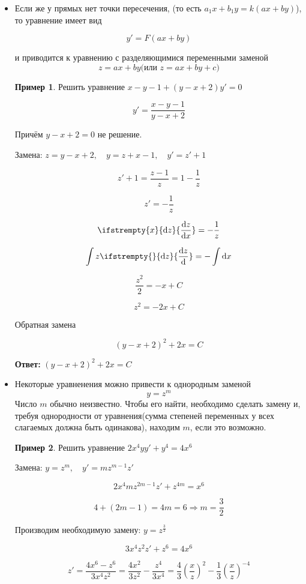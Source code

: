 \documentclass[a4paper, 14pt]{article}
\newcommand{\dx}{\mathrm{d}x}
\newcommand{\dv}[2]{%
  \ifstrempty{#2}%
    {\mathrm{d}#1}%
    {\frac{\mathrm{d}#1}{\mathrm{d}#2}}%
}
\theoremstyle{definition}
\newtheorem*{example}{Пример}
\newenvironment{answer}
  {\par\noindent\textbf{Ответ:}}
  {\par}
\begin{document}
\begin{itemize}
\item \textbf{}Если же у прямых нет точки пересечения, (то есть $a_1x+b_1y = k(ax+by)$), то уравнение имеет вид 
 
 \[y'= F(ax+by)\]
 
 и приводится к уравнению с разделяющимися переменными заменой 
 \[z = ax+by \text{(или } z = ax+by+c\text{)}\]

\begin{example}
    Решить уравнение $x-y-1 +(y-x+2)y'=0$

    \[y'=\frac{x-y-1}{y-x+2}\]

    Причём $y-x+2=0$ не решение.

    Замена: $z =y -x +2, \quad y = z +x-1, \quad y'= z'+1$

    \[z'+1=\frac{z-1}{z} = 1-\frac{1}{z}\]

    \[z'=-\frac{1}{z}\]

    \[\dv{z}{x}= -\frac{1}{z}\]

    \[\int{z}\dv{z}{} = -\int\dx\]

    \[\frac{z^2}{2} = -x+C\]

    \[z^2 = -2x + C\]

    Обратная замена

    \[(y-x+2)^2 + 2x= C\]
\end{example}
\begin{answer}
    $(y-x+2)^2 + 2x= C$
\end{answer}



\item \textbf{}Некоторые уравненения можно привести к однородным заменой 
\[y = z^m\]
Число $m$ обычно неизвестно. Чтобы его найти, необходимо сделать замену и, требуя однородности от уравнения(сумма степеней переменных у всех слагаемых должна быть одинакова), находим $m$, если это возможно.

\begin{example}
    Решить уравнение $2x^4yy'+y^4=4x^6$

    Замена: $y = z^m, \quad y' = mz^{m-1}z'$

    \[2x^4mz^{2m-1}z' + z^{4m} = x^6\]

    \[4 + (2m-1) = 4m = 6 \Longrightarrow m =\frac{3}{2}\]

    Производим необходимую замену: $y=z^{\frac{3}{2}}$

    \[3x^4z^2z' + z^6 = 4x^6\]

    \[z'=\frac{4x^6-z^6}{3x^4z^2} = \frac{4x^2}{3z^2} -\frac{z^4}{3x^4} = \frac{4}{3}\left(\frac{x}{z}\right)^2-\frac{1}{3}\left(\frac{x}{z}\right)^{-4}\]


\end{example}
\end{itemize}
\end{document}
